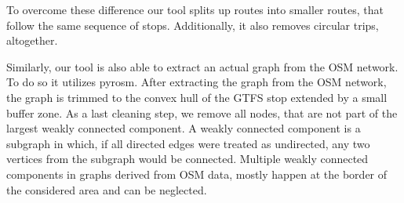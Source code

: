To overcome these difference our tool splits up routes into smaller routes, that follow the same sequence of stops.
Additionally, it also removes circular trips, altogether.

Similarly, our tool is also able to extract an actual graph from the OSM network.
To do so it utilizes pyrosm.
After extracting the graph from the OSM network, the graph is trimmed to the convex hull of the GTFS stop extended by a small buffer zone.
As a last cleaning step, we remove all nodes, that are not part of the largest weakly connected component.
A weakly connected component is a subgraph in which, if all directed edges were treated as undirected, any two vertices from the subgraph would be connected.
Multiple weakly connected components in graphs derived from OSM data, mostly happen at the border of the considered area and can be neglected.

